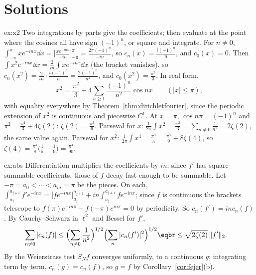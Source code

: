 \section{Solutions}

\begin{solution}{ex:x2}
\idea Two integrations by parts give the coefficients; then evaluate at the point where the cosines all have sign
$(-1)^n$, or square and integrate.
\writeup For $n\ne0$, $\int_{-\pi}^\pi xe^{-inx}\dd x=\bigl[\frac{xe^{-inx}}{-in}\bigr]_{-\pi}^\pi=\frac{2\pi(-1)^n}{-in}$, so $c_n(x)=\frac{i(-1)^n}n$, and $c_0(x)=0$. Then
$\int x^2e^{-inx}\dd x=\frac2{in}\int xe^{-inx}\dd x$ (the bracket vanishes), so $c_n(x^2)=\frac2{in}\cdot\frac{i(-1)^n}n=\frac{2(-1)^n}{n^2}$, and $c_0(x^2)=\frac{\pi^2}3$. In real form,
\[
x^2=\frac{\pi^2}3+4\sum_{n\ge1}\frac{(-1)^n}{n^2}\cos nx\qquad(|x|\le\pi),
\]
with equality everywhere by Theorem~\ref{thm:dirichletfourier}, since the periodic extension of $x^2$ is continuous and piecewise $C^1$. At $x=\pi$,
$\cos n\pi=(-1)^n$ and $\pi^2=\frac{\pi^2}3+4\zeta(2)$: $\zeta(2)=\frac{\pi^2}6$. Parseval for $x$: $\frac1{2\pi}\int x^2=\frac{\pi^2}3=\sum_{n\ne0}\frac1{n^2}=2\zeta(2)$, the
same value again. Parseval for $x^2$: $\frac1{2\pi}\int x^4=\frac{\pi^4}5=\frac{\pi^4}9+8\zeta(4)$, so $\zeta(4)=\frac{\pi^4}8\bigl(\frac15-\frac19\bigr)=\frac{\pi^4}{90}$.
\end{solution}

\begin{solution}{ex:abs}
\idea Differentiation multiplies the coefficients by $in$; since $f'$ has square-summable coefficients, those of $f$ decay fast
enough to be summable.
\writeup Let $-\pi=a_0<\cdots<a_m=\pi$ be the pieces. On each, $\int_{a_j}^{a_{j+1}}f'e^{-inx}=\bigl[fe^{-inx}\bigr]_{a_j}^{a_{j+1}}+in\int_{a_j}^{a_{j+1}}fe^{-inx}$; since $f$
is continuous the brackets telescope to $f(\pi)e^{-in\pi}-f(-\pi)e^{in\pi}=0$ by periodicity. So $c_n(f')=inc_n(f)$. By Cauchy--Schwarz in $\ell^2$
and Bessel for $f'$,
\[
\begin{aligned}\sum_{n\ne0}|c_n(f)|&\le\Bigl(\sum_{n\ne0}\frac1{n^2}\Bigr)^{1/2}\Bigl(\sum_n|c_n(f')|^2\Bigr)^{1/2}\eqbr\le\sqrt{2\zeta(2)}\,\|f'\|_2.\end{aligned}
\]
By the Weierstrass test $S_Nf$ converges uniformly, to a continuous $g$; integrating term by term, $c_n(g)=c_n(f)$, so $g=f$ by
Corollary~\ref{cor:fejer}(b).
\end{solution}

